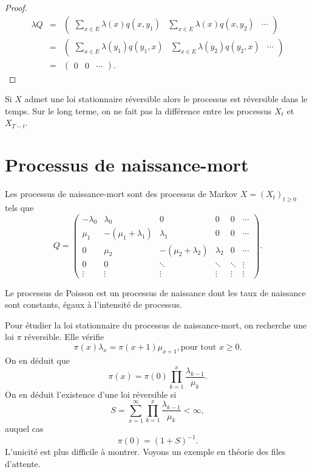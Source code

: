 \begin{proof}
\begin{eqnarray*}
\lambda Q &=& \left(\begin{array}{ccc}\sum_{x\in E}\lambda(x)q(x,y_1)&\sum_{x\in E}\lambda(x)q(x,y_2)&\cdots\end{array}\right) \\
&=&\left(\begin{array}{ccc}\sum_{x\in E}\lambda(y_1)q(y_1,x)&\sum_{x\in E}\lambda(y_2)q(y_2,x)&\cdots\end{array}\right)\\
 &=& \left(\begin{array}{ccc}0&0&\cdots\end{array}\right).
\end{eqnarray*}
\end{proof}
\begin{remark}
Si $X$ admet une loi stationnaire réversible alors le processus est réversible dans le temps. Sur le long terme, on ne fait pas la différence entre les processus $X_t$ et $X_{T-t}$.
\end{remark}

\section{Processus de naissance-mort}
Les processus de naissance-mort sont des processus de Markov $X = (X_t)_{t\geq 0}$ tels que 
$$
Q=\left(
\begin{array}{ccccccc}
-\lambda_0&\lambda_0&0&0&0&\cdots \\
\mu_1&-(\mu_1 +\lambda_1)&\lambda_1&0&0&\cdots \\
0&\mu_2&-(\mu_2 +\lambda_2)&\lambda_2&0&\cdots \\
0&0&\ddots&\ddots&\ddots &\vdots \\
\vdots&\vdots&\vdots&\vdots&\vdots&\vdots
\end{array}
\right).
$$
\begin{ex}
Le processus de Poisson est un processus de naissance dont les taux de naissance sont constants, égaux à l'intensité de processus.
\end{ex}
Pour étudier la loi stationnaire du processus de naissance-mort, on recherche une loi $\pi$ réversible. Elle vérifie 
$$
\pi(x)\lambda_{x} = \pi(x+1)\mu_{x+1},\text{pour tout }x \geq0.
$$
On en déduit que 
$$
\pi(x) = \pi(0)\prod_{k=1}^x\frac{\lambda_{k-1}}{\mu_k}.
$$
On en déduit l'existence d'une loi réversible si 
$$
S = \sum_{x=1}^{\infty}\prod_{k=1}^x\frac{\lambda_{k-1}}{\mu_k} <\infty,
$$
auquel cas 
$$
\pi(0) = (1+S)^{-1}.
$$
L'unicité est plus difficile à montrer. Voyons un exemple en théorie des files d'attente. 
